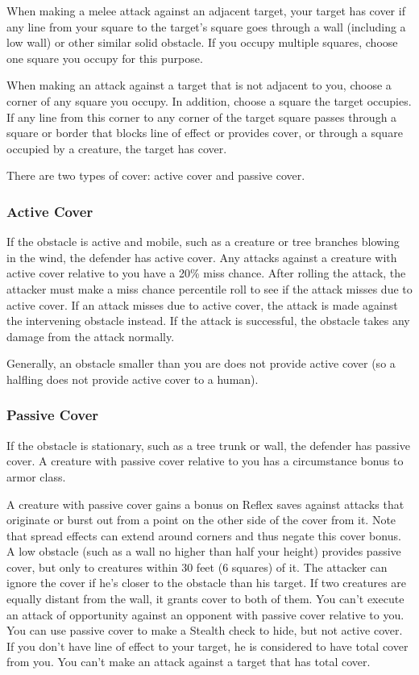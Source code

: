 When making a melee attack against an adjacent target, your target has cover if any line from your square to the target's square goes through a wall (including a low wall) or other similar solid obstacle. If you occupy multiple squares, choose one square you occupy for this purpose.

When making an attack against a target that is not adjacent to you, choose a corner of any square you occupy. In addition, choose a square the target occupies. If any line from this corner to any corner of the target square passes through a square or border that blocks line of effect or provides cover, or through a square occupied by a creature, the target has cover.

There are two types of cover: active cover and passive cover.

\subsubsection{Active Cover}

If the obstacle is active and mobile, such as a creature or tree branches blowing in the wind, the defender has active cover. Any attacks against a creature with active cover relative to you have a 20\% miss chance. After rolling the attack, the attacker must make a miss chance percentile roll to see if the attack misses due to active cover. If an attack misses due to active cover, the attack is made against the intervening obstacle instead. If the attack is successful, the obstacle takes any damage from the attack normally. 

 Generally, an obstacle smaller than you are does not provide active cover (so a halfling does not provide active cover to a human). 

\subsubsection{Passive Cover}

If the obstacle is stationary, such as a tree trunk or wall, the defender has passive cover. A creature with passive cover relative to you has a  circumstance bonus to armor class.

 A creature with passive cover gains a  bonus on Reflex saves against attacks that originate or burst out from a point on the other side of the cover from it. Note that spread effects can extend around corners and thus negate this cover bonus.
 A low obstacle (such as a wall no higher than half your height) provides passive cover, but only to creatures within 30 feet (6 squares) of it. The attacker can ignore the cover if he's closer to the obstacle than his target. If two creatures are equally distant from the wall, it grants cover to both of them.
 You can't execute an attack of opportunity against an opponent with passive cover relative to you.
 You can use passive cover to make a Stealth check to hide, but not active cover.
 If you don't have line of effect to your target, he is considered to have total cover from you. You can't make an attack against a target that has total cover.

